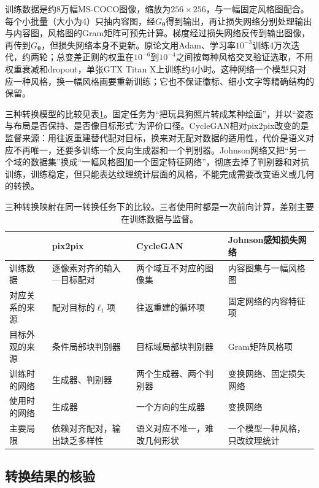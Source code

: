 训练数据是约8万幅MS-COCO图像，缩放为$256\times256$，与一幅固定风格图配合。每个小批量（大小为4）只抽内容图，经$G_{\bm{\theta}}$得到输出，再让损失网络分别处理输出与内容图，风格图的Gram矩阵可预先计算。梯度经过损失网络反传到输出图像，再传到$G_{\bm{\theta}}$，但损失网络本身不更新。原论文用Adam、学习率$10^{-3}$训练4万次迭代，约两轮；总变差正则的权重在$10^{-6}$到$10^{-4}$之间按每种风格交叉验证选取，不用权重衰减和dropout，单张GTX Titan X上训练约4小时。这种网络一个模型只对应一种风格，换一幅风格画要重新训练；它也不保证徽标、细小文字等精确结构的保留。

三种转换模型的比较见表\ref{tab:vision-generation-translation-comparison}。固定任务为“把玩具狗照片转成某种绘画”，并以“姿态与布局是否保持、是否像目标形式”为评价口径。CycleGAN相对pix2pix改变的是监督来源：用往返重建替代配对目标，换来对无配对数据的适用性，代价是语义对应不再唯一，还要多训练一个反向生成器和一个判别器。Johnson网络又把“另一个域的数据集”换成“一幅风格图加一个固定特征网络”，彻底去掉了判别器和对抗训练，训练稳定，但只能表达纹理统计层面的风格，不能完成需要改变语义或几何的转换。

\begin{table}[htbp]
 \centering
 \small
 \begin{tabularx}{\linewidth}{@{}l X X X@{}}
  \toprule
   & pix2pix & CycleGAN & Johnson感知损失网络\\
  \midrule
  训练数据 & 逐像素对齐的输入—目标配对 & 两个域互不对应的图像集 & 内容图集与一幅风格图\\
  对应关系的来源 & 配对目标的$\ell_1$项 & 往返重建的循环项 & 固定网络的内容特征项\\
  目标外观的来源 & 条件局部块判别器 & 目标域局部块判别器 & Gram矩阵风格项\\
  训练时的网络 & 生成器、判别器 & 两个生成器、两个判别器 & 变换网络、固定损失网络\\
  使用时的网络 & 生成器 & 一个方向的生成器 & 变换网络\\
  主要局限 & 依赖对齐配对，输出缺乏多样性 & 语义对应不唯一，难改几何形状 & 一个模型一种风格，只改纹理统计\\
  \bottomrule
 \end{tabularx}
 \caption{三种转换映射在同一转换任务下的比较。三者使用时都是一次前向计算，差别主要在训练数据与监督。}
 \label{tab:vision-generation-translation-comparison}
\end{table}

\subsection{转换结果的核验}
\label{sec:vision-generation-translation-check}

